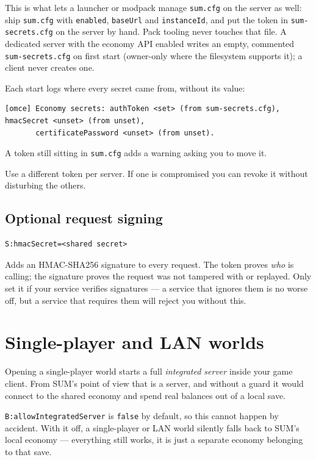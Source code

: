 \documentclass[11pt,a4paper]{article}
\newcommand{\code}[1]{\texttt{\small #1}}
\newcommand{\keybox}[2]{%
  \par\vspace{0.5em}\noindent
  \colorbox{#1}{\begin{minipage}{\dimexpr\linewidth-2\fboxsep\relax}
  \vspace{0.35em}\small #2\vspace{0.35em}\end{minipage}}\par\vspace{0.5em}}
\newcommand{\warn}[1]{\keybox{omceWarnWash}{#1}}
\begin{document}
This is what lets a launcher or modpack manage \code{sum.cfg} on the server as well: ship
\code{sum.cfg} with \code{enabled}, \code{baseUrl} and \code{instanceId}, and put the token in
\code{sum-secrets.cfg} on the server by hand. Pack tooling never touches that file. A dedicated
server with the economy API enabled writes an empty, commented \code{sum-secrets.cfg} on first
start (owner-only where the filesystem supports it); a client never creates one.

Each start logs where every secret came from, without its value:

\begin{lstlisting}
[omce] Economy secrets: authToken <set> (from sum-secrets.cfg), hmacSecret <unset> (from unset),
       certificatePassword <unset> (from unset).
\end{lstlisting}

A token still sitting in \code{sum.cfg} adds a warning asking you to move it.

Use a different token per server. If one is compromised you can revoke it without disturbing the
others.

\subsection{Optional request signing}

\begin{lstlisting}
S:hmacSecret=<shared secret>
\end{lstlisting}

Adds an HMAC-SHA256 signature to every request. The token proves \emph{who} is calling; the
signature proves the request was not tampered with or replayed. Only set it if your service
verifies signatures --- a service that ignores them is no worse off, but a service that requires
them will reject you without this.

\section{Single-player and LAN worlds}

\warn{Opening a single-player world starts a full \emph{integrated server} inside your game
client. From SUM's point of view that is a server, and without a guard it would connect to the
shared economy and spend real balances out of a local save.}

\code{B:allowIntegratedServer} is \code{false} by default, so this cannot happen by accident. With
it off, a single-player or LAN world silently falls back to SUM's local economy --- everything
still works, it is just a separate economy belonging to that save.
\end{document}
